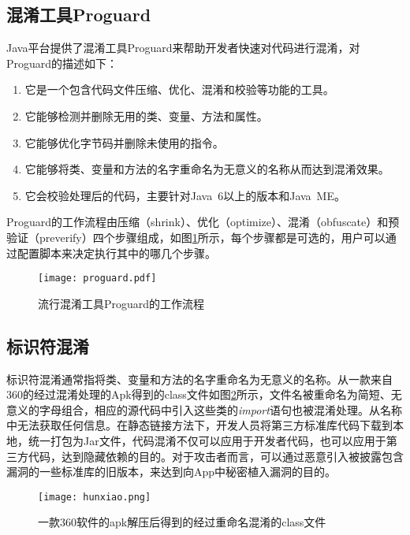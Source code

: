\subsection{混淆工具Proguard}
Java平台提供了混淆工具Proguard\cite{proguard}来帮助开发者快速对代码进行混淆，对Proguard的描述如下：
\begin{enumerate}
\item{它是一个包含代码文件压缩、优化、混淆和校验等功能的工具。}
\item{它能够检测并删除无用的类、变量、方法和属性。}
\item{它能够优化字节码并删除未使用的指令。}
\item{它能够将类、变量和方法的名字重命名为无意义的名称从而达到混淆效果。}
\item{它会校验处理后的代码，主要针对Java\ 6以上的版本和Java\ ME。}
\end{enumerate}

Proguard的工作流程由压缩（shrink）、优化（optimize）、混淆（obfuscate）和预验证（preverify）四个步骤组成，如图\ref{fig:proguard}所示，每个步骤都是可选的，用户可以通过配置脚本来决定执行其中的哪几个步骤\cite{csdn}。

\begin{figure}[!htp]
  \centering
  \texttt{[image: proguard.pdf]} \\
  \caption{流行混淆工具Proguard的工作流程}
 \label{fig:proguard}
\end{figure}


\subsection{标识符混淆}
标识符混淆通常指将类、变量和方法的名字重命名为无意义的名称。从一款来自360的经过混淆处理的Apk得到的class文件如图\ref{fig:hunxiao}所示，文件名被重命名为简短、无意义的字母组合，相应的源代码中引入这些类的\textit{import}语句也被混淆处理。从名称中无法获取任何信息。在静态链接方法下，开发人员将第三方标准库代码下载到本地，统一打包为Jar文件，代码混淆不仅可以应用于开发者代码，也可以应用于第三方代码，达到隐藏依赖的目的。对于攻击者而言，可以通过恶意引入被披露包含漏洞的一些标准库的旧版本，来达到向App中秘密植入漏洞的目的\cite{hammad2018large}。

\begin{figure}[!htp]
  \centering
  \texttt{[image: hunxiao.png]} \\
  \caption{一款360软件的apk解压后得到的经过重命名混淆的class文件}
 \label{fig:hunxiao}
\end{figure}

